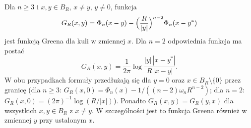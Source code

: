 \begin{stwierdzenie}
\label{prop:pde3-ball-green}
Dla $n\geq3$ i $x,y\in B_R$, $x\ne y$, $y\ne0$, funkcja
\begin{equation}\label{eq:pde3-ball-green}
 G_R(x,y)=\Phi_n(x-y)-\Bigl(\frac R{|y|}\Bigr)^{n-2}
 \Phi_n(x-y^*)
\end{equation}
jest funkcją Greena dla kuli w zmiennej $x$.
Dla $n=2$ odpowiednia funkcja ma postać
\[
 G_R(x,y)=\frac1{2\pi}\log\frac{|y|\,|x-y^*|}{R\,|x-y|}.
\]
W obu przypadkach formuły przedłużają się dla $y=0$
oraz $x\in B_R\setminus\{0\}$ przez granicę (dla $n\geq3$:
$G_R(x,0)=\Phi_n(x)-1/((n-2)\omega_n R^{n-2})$;
dla $n=2$: $G_R(x,0)=(2\pi)^{-1}\log(R/|x|)$).
Ponadto $G_R(x,y)=G_R(y,x)$ dla wszystkich
$x,y\in B_R$ z $x\ne y$. W szczególności jest to
funkcja Greena również w zmiennej $y$ przy ustalonym $x$.
\end{stwierdzenie}
